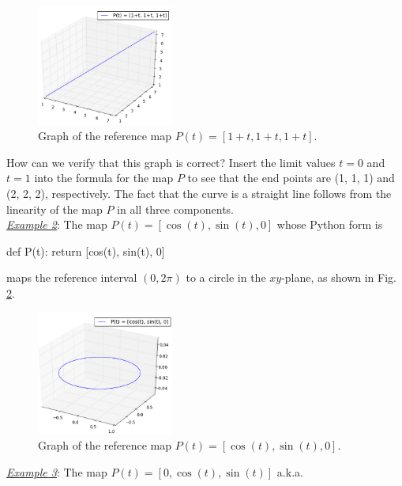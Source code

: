 \begin{figure}[!ht]
\begin{center}
\includegraphics[width=0.4\textwidth]{img/paramcu1.png}
\end{center}
\vspace{-6mm}
\caption{Graph of the reference map $P(t) = [1+t, 1+t, 1+t]$.}
\vspace{-1cm}
\label{fig:paramcu1}
\end{figure}
\newpage
\noindent
How can we verify that this graph is correct? 
Insert the limit values $t = 0$ and $t = 1$ into the formula for the map $P$ 
to see that the end points are (1, 1, 1) and (2, 2, 2), respectively. The 
fact that the curve is a straight line follows from the linearity of the 
map $P$ in all three components. \\

\noindent
\underline{\em Example 2}: The map
$
P(t) = [\cos(t), \sin(t), 0]
$
whose Python form is

\begin{bluecode}
def P(t): return [cos(t), sin(t), 0]
\end{bluecode}
maps the reference interval $(0, 2\pi)$ to a circle in the 
$xy$-plane, as shown in Fig. \ref{fig:paramcu2}.

\begin{figure}[!ht]
\begin{center}
\includegraphics[width=0.4\textwidth]{img/paramcu2.png}
\end{center}
\vspace{-6mm}
\caption{Graph of the reference map $P(t) = [\cos(t), \sin(t), 0]$.}
\label{fig:paramcu2}
\end{figure}
\noindent
\noindent
\underline{\em Example 3}: The map
$
P(t) = [0, \cos(t), \sin(t)]
$
a.k.a.

